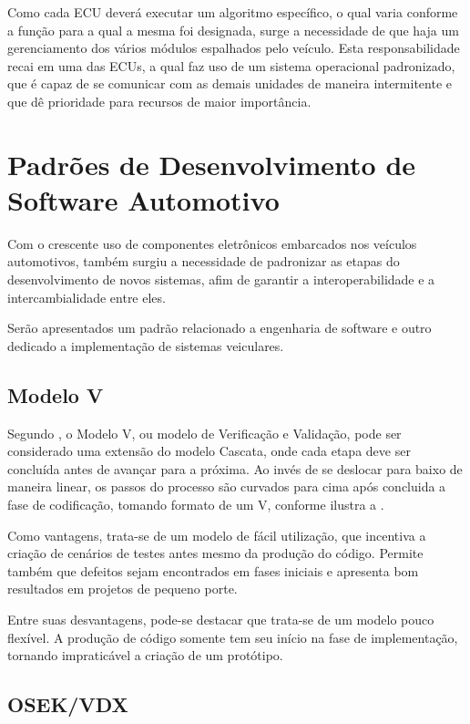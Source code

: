 Como cada ECU deverá executar um algoritmo específico, o qual varia conforme a função para a qual a mesma foi designada, surge a necessidade de que haja um gerenciamento dos vários módulos espalhados pelo veículo. Esta responsabilidade recai em uma das ECUs, a qual faz uso de um sistema operacional padronizado, que é capaz de se comunicar com as demais unidades de maneira intermitente e que dê prioridade para recursos de maior importância.

\section{Padrões de Desenvolvimento de Software Automotivo}

Com o crescente uso de componentes eletrônicos embarcados nos veículos automotivos, também surgiu a necessidade de padronizar as etapas do desenvolvimento de novos sistemas, afim de garantir a interoperabilidade e a intercambialidade entre eles.

Serão apresentados um padrão relacionado a engenharia de software e outro dedicado a implementação de sistemas veiculares.

\subsection{Modelo V}

Segundo , o Modelo V, ou modelo de Verificação e Validação, pode ser considerado uma extensão do modelo Cascata, onde cada etapa deve ser concluída antes de avançar para a próxima. Ao invés de se deslocar para baixo de maneira linear, os passos do processo são curvados para cima após concluida a fase de codificação, tomando formato de um V, conforme ilustra a .


Como vantagens, trata-se de um modelo de fácil utilização, que incentiva a criação de cenários de testes antes mesmo da produção do código. Permite também que defeitos sejam encontrados em fases iniciais e apresenta bom resultados em projetos de pequeno porte.

Entre suas desvantagens, pode-se destacar que trata-se de um modelo pouco flexível. A produção de código somente tem seu início na fase de implementação, tornando impraticável a criação de um protótipo.

\subsection{OSEK/VDX}

